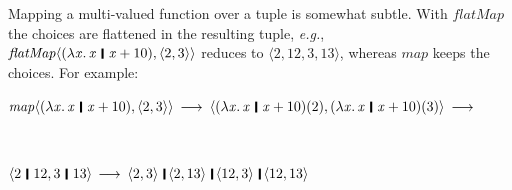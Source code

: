\documentclass[acmsmall]{acmart}
\newcommand{\Varid}[1]{\mathit{#1}}
\newcommand{\ie}{\emph{i.e.}\xspace}	%
\newcommand{\eg}{\emph{e.g.}\xspace}
\begin{document}
Mapping a multi-valued function over a tuple is somewhat subtle.
With \ensuremath{\Varid{flatMap}} the choices are flattened in the resulting tuple, \eg,
\ensuremath{\Varid{flatMap}\langle(\lambda\Varid{x}.\,\Varid{x}\hspace{0.2em}\mathop{\rule[-0.1em]{0.15em}{0.75em}}\hspace{0.2em}\Varid{x}\mathbin{+}\mathrm{10}),\langle{}\mathrm{2},\mathrm{3}\rangle\rangle} reduces to \ensuremath{\langle{}\mathrm{2},\mathrm{12},\mathrm{3},\mathrm{13}\rangle},
whereas \ensuremath{\Varid{map}} keeps the choices. For example:\\[0.2em]
\centerline{
\ensuremath{\Varid{map}\langle(\lambda\Varid{x}.\,\Varid{x}\hspace{0.2em}\mathop{\rule[-0.1em]{0.15em}{0.75em}}\hspace{0.2em}\Varid{x}\mathbin{+}\mathrm{10}),\langle{}\mathrm{2},\mathrm{3}\rangle\rangle}
$\longrightarrow$
\ensuremath{\langle{}(\lambda\Varid{x}.\,\Varid{x}\hspace{0.2em}\mathop{\rule[-0.1em]{0.15em}{0.75em}}\hspace{0.2em}\Varid{x}\mathbin{+}\mathrm{10})(\mathrm{2}),(\lambda\Varid{x}.\,\Varid{x}\hspace{0.2em}\mathop{\rule[-0.1em]{0.15em}{0.75em}}\hspace{0.2em}\Varid{x}\mathbin{+}\mathrm{10})(\mathrm{3})\rangle}
$\longrightarrow$}\\
\centerline{
\ensuremath{\langle{}\mathrm{2}\hspace{0.2em}\mathop{\rule[-0.1em]{0.15em}{0.75em}}\hspace{0.2em}\mathrm{12},\mathrm{3}\hspace{0.2em}\mathop{\rule[-0.1em]{0.15em}{0.75em}}\hspace{0.2em}\mathrm{13}\rangle}
$\longrightarrow$
\ensuremath{\langle{}\mathrm{2},\mathrm{3}\rangle\hspace{0.2em}\mathop{\rule[-0.1em]{0.15em}{0.75em}}\hspace{0.2em}\langle{}\mathrm{2},\mathrm{13}\rangle\hspace{0.2em}\mathop{\rule[-0.1em]{0.15em}{0.75em}}\hspace{0.2em}\langle{}\mathrm{12},\mathrm{3}\rangle\hspace{0.2em}\mathop{\rule[-0.1em]{0.15em}{0.75em}}\hspace{0.2em}\langle{}\mathrm{12},\mathrm{13}\rangle}
}\vspace{0.2em}
\end{document}
